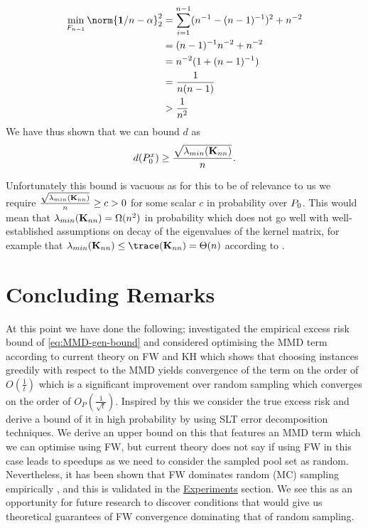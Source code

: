 \begin{align*}
  \min_{F_{n-1}}\norm{\mathbf{1}/n - \mat{\alpha}}_{2}^2 & = \sum_{i=1}^{n-1}(n^{-1} - (n-1)^{-1})^{2} + n^{-2} \\
                                                         & = (n-1)^{-1}n^{-2} + n^{-2} \\
                                                         & = n^{-2}(1 + (n-1)^{-1}) \\
                                                         & = \frac{1}{n(n-1)} \\
                                                         & > \frac{1}{n^{2}}
\end{align*}
We have thus shown that we can bound \(d\) as
\begin{equation*}
  \label{eq:lower-bound-on-d}
  d(P^x_{0}) \geq \frac{\sqrt{\lambda_{min}(\mathbf{K}_{nn})}}{n}.
\end{equation*}

Unfortunately this bound is vacuous as for this to be of relevance to us we
require \(\frac{\sqrt{\lambda_{min}(\mathbf{K}_{nn})}}{n} \geq c > 0\) for some
scalar \(c\) in probability over \(P_{0}\). This would mean that
\(\lambda_{min}(\mathbf{K}_{nn}) = \Omega(n^{2})\) in probability which does not go
well with well-established assumptions on decay of the eigenvalues of the kernel
matrix, for example that \(\lambda_{min}(\mat{K}_{nn}) \leq \trace(\mat{K}_{nn})
= \Theta(n)\) according to \citep{bach13_sharp}.

\section{Concluding Remarks}
At this point we have done the following; investigated the empirical excess risk
bound of \ref{eq:MMD-gen-bound} and considered optimising the MMD term
according to current theory on FW and KH which shows that choosing instances greedily
with respect to the MMD yields convergence of the term on the order of
\(O(\frac{1}{t})\) which is a significant improvement over random sampling which
converges on the order of \(O_P(\frac{1}{\sqrt{t}})\). Inspired by this we consider
the true excess risk and derive a bound of it in high probability by using SLT
error decomposition techniques. We derive an upper bound on this that features
an MMD term which we can optimise using FW, but current theory does not say if
using FW in this case leads to speedups as we need to consider the sampled
pool set as random. Nevertheless, it has been shown that FW dominates random
(MC) sampling empirically \citep{bach12_equiv_between_herdin_condit_gradien_algor},
and this is validated in the \hyperref[ch:experiments]{Experiments} section. We
see this as an opportunity for future research to discover conditions that would
give us theoretical guarantees of FW convergence dominating that of random sampling.
